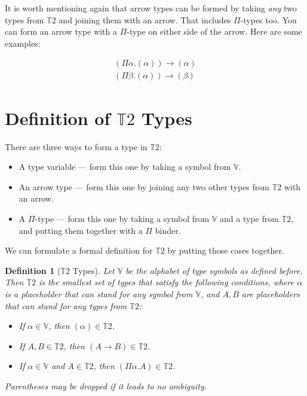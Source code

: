 \documentclass{book}
\numberwithin{equation}{chapter}
\newtheorem{definition}{Definition}
\begin{document}
It is worth mentioning again that arrow types can be formed by taking \textit{any} two types from $\mathbb{T}2$ and joining them with an arrow. That includes $\Pi$-types too. You can form an arrow type with a $\Pi$-type on either side of the arrow. Here are some examples:

\begin{align}
  (\Pi \alpha.(\alpha)) \rightarrow (\alpha) \\
  (\Pi \beta.(\alpha)) \rightarrow (\beta)
\end{align}


\section{Definition of $\mathbb{T}2$ Types}

There are three ways to form a type in $\mathbb{T}2$:

\begin{itemize}
\item{A type variable --- form this one by taking a symbol from $\mathbb{V}$.}
\item{An arrow type --- form this one by joining any two other types from $\mathbb{T}2$ with an arrow.}
  \item{A $\Pi$-type --- form this one by taking a symbol from $\mathbb{V}$ and a type from $\mathbb{T}2$, and putting them together with a $\Pi$ binder.}
\end{itemize}

\noindent
We can formulate a formal definition for $\mathbb{T}2$ by putting those cases together.

\begin{definition}[$\mathbb{T}2$ Types]
  Let $\mathbb{V}$ be the alphabet of type symbols as defined before. Then $\mathbb{T}2$ is the smallest set of types that satisfy the following conditions, where $\alpha$ is a placeholder that can stand for any symbol from $\mathbb{V}$, and $A, B$ are placeholders that can stand for any types from $\mathbb{T}2$:

\begin{itemize}
\item{If $\alpha \in \mathbb{V}$, then $(\alpha) \in \mathbb{T}2$.}
\item{If $A, B \in \mathbb{T}2$, then $(A \rightarrow B) \in \mathbb{T}2$.}
\item{If $\alpha \in \mathbb{V}$ and $A \in \mathbb{T}2$, then $(\Pi \alpha.A) \in \mathbb{T}2$.}
\end{itemize}

\noindent
Parentheses may be dropped if it leads to no ambiguity.

\end{definition}
\end{document}
